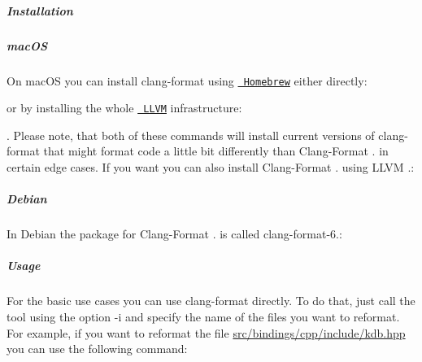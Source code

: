 \label{doc_CODING_md_autotoc_md984}%
%
\subparagraph*{Installation}

\subparagraph*{mac\+OS}

On mac\+OS you can install {\ttfamily clang-\/format} using \href{https://brew.sh}{\texttt{ Homebrew}} either directly\+:


\begin{DoxyCode}{0}
\end{DoxyCode}


or by installing the whole \href{http://llvm.org}{\texttt{ L\+L\+VM}} infrastructure\+:


\begin{DoxyCode}{0}
\end{DoxyCode}


. Please note, that both of these commands will install current versions of {\ttfamily clang-\/format} that might format code a little bit differently than Clang-\/\+Format {.} in certain edge cases. If you want you can also install Clang-\/\+Format {.} using L\+L\+VM {.}\+:


\begin{DoxyCode}{0}
\end{DoxyCode}


\subparagraph*{Debian}

In Debian the package for Clang-\/\+Format {.} is called {\ttfamily clang-\/format-\/6.}\+:


\begin{DoxyCode}{0}
\end{DoxyCode}


\label{doc_CODING_md_autotoc_md985}%
%
\subparagraph*{Usage}

For the basic use cases you can use {\ttfamily clang-\/format} directly. To do that, just call the tool using the option {\ttfamily -\/i} and specify the name of the files you want to reformat. For example, if you want to reformat the file {\ttfamily \mbox{\hyperlink{kdb_8hpp}{src/bindings/cpp/include/kdb.\+hpp}}} you can use the following command\+:


\begin{DoxyCode}{0}
\end{DoxyCode}


